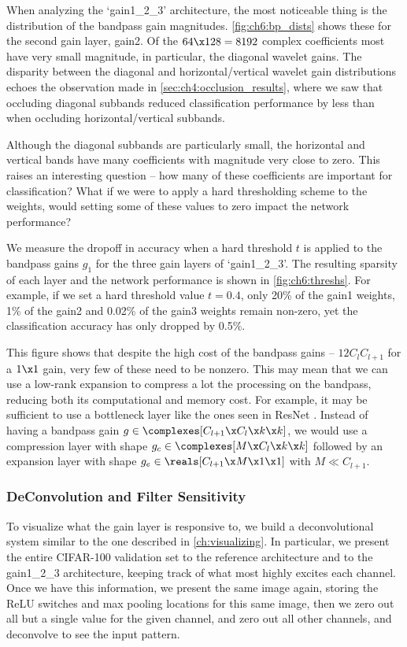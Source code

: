 When analyzing the `gain1\_2\_3' architecture, the most noticeable thing is the
distribution of the bandpass gain magnitudes. \autoref{fig:ch6:bp_dists} shows
these for the second gain layer, gain2. Of the $64\x 128=8192$ complex
coefficients most have very small magnitude, in particular, the diagonal wavelet
gains. The disparity between the diagonal and horizontal/vertical wavelet gain
distributions echoes the observation made in
\autoref{sec:ch4:occlusion_results}, where we saw that occluding diagonal
subbands reduced classification performance by less than when occluding
horizontal/vertical subbands.

Although the diagonal subbands are particularly small, the horizontal and
vertical bands have many coefficients with magnitude very close to zero.
This raises an interesting question -- how many of these coefficients are
important for classification? What if we were to apply a hard thresholding
scheme to the weights, would setting some of these values to zero impact the
network performance?

We measure the dropoff in accuracy when a hard threshold $t$ is applied to the
bandpass gains $g_1$ for the three gain layers of `gain1\_2\_3'. The resulting sparsity
of each layer and the network performance is shown in \autoref{fig:ch6:threshs}.
For example, if we set a hard threshold value $t=0.4$, only 20\% of the gain1
weights, 1\% of the gain2 and 0.02\% of the gain3 weights remain non-zero, yet the
classification accuracy has only dropped by 0.5\%.

This figure shows that despite the high cost of the bandpass gains --
$12C_{l}C_{l+1}$ for a $1\x1$ gain, very few of these need to be nonzero. This
may mean that we can use a low-rank expansion to compress a lot the processing
on the bandpass, reducing both its computational and memory cost. For example,
it may be sufficient to use a bottleneck layer like the ones seen in ResNet
\cite{he_deep_2016}. Instead of having a bandpass gain 
$g \in \complexes[C_{l+1}\x C_l\x k\x k]$, we would use a compression layer with shape $g_{c} \in \complexes[M\x
C_l\x k\x k]$ followed by an expansion layer with shape $g_e \in \reals[C_{l+1}\x M\x
1\x 1]$ with $M \ll C_{l+1}$.


\subsubsection{DeConvolution and Filter Sensitivity}
To visualize what the gain layer is responsive to, we build a deconvolutional
system similar to the one described in \autoref{ch:visualizing}. In
particular, we present the entire CIFAR-100 validation set to the reference
architecture and to the gain1\_2\_3 architecture, keeping track of what most
highly excites each channel. Once we have this information, we present the same
image again, storing the ReLU switches and max pooling locations for this same
image, then we zero out all but a single value for the given channel, and zero out all
other channels, and deconvolve to see the input pattern.

